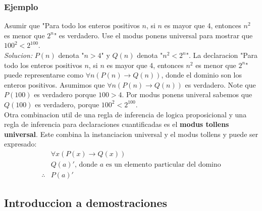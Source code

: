 \documentclass[]{article}
\begin{document}
\subsubsection*{Ejemplo}

Asumir que "Para todo los enteros positivos $n$, si $n$ es mayor que 4, entonces $n^{2}$ es menor que $2^{n}$" es verdadero. Use el modus ponens universal para mostrar que $100^{2} < 2^{100}$.\\
\textit{Solucion:} $P(n)$ denota "$n > 4$" y $Q(n)$ denota "$n^{2} < 2^{n}$". La declaracion "Para todo los enteros positivos $n$, si $n$ es mayor que 4, entonces $n^{2}$ es menor que $2^{n}$" puede representarse como $\forall n(P(n) \rightarrow Q(n))$, donde el dominio son los enteros positivos. Asumimos que $\forall n(P(n) \rightarrow Q(n))$ es verdadero. Note que $P(100)$ es verdadero porque $100 > 4$. Por modus ponens univeral sabemos que $Q(100)$ es verdadero, porque $100^{2} < 2^{100}$.\\

Otra combinacion util de una regla de inferencia de logica proposicional y una regla de inferencia para declaraciones cuantificadas es el \textbf{modus tollens universal}. Este combina la instanciacion universal y el modus tollens y puede ser expresado:
\begin{equation*}
	\begin{aligned}
		&\forall x(P(x) \rightarrow Q(x))\\
		&Q(a)'\text{, donde $a$ es un elemento particular del domino}\\
		\therefore &P(a)'
	\end{aligned}
\end{equation*}

\subsection{Introduccion a demostraciones}
\end{document}
